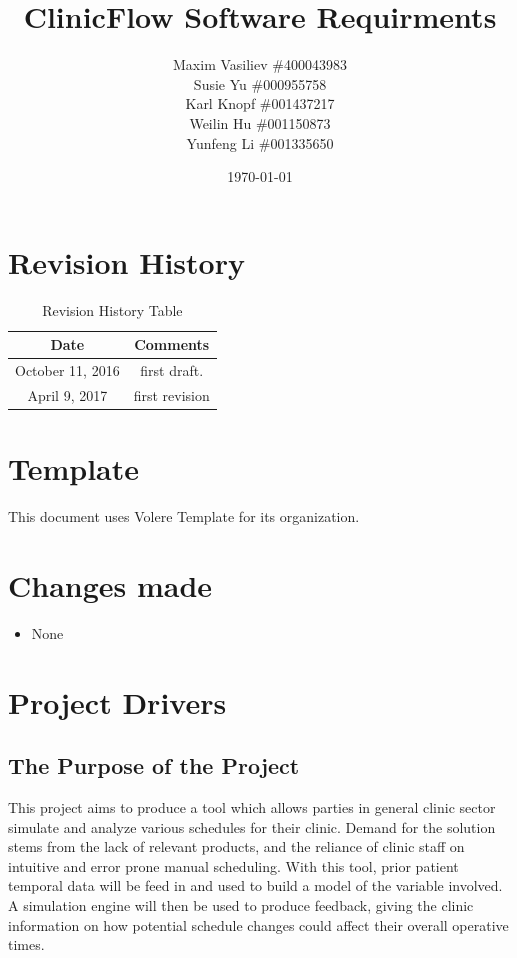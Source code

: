 \documentclass[12pt, titlepage]{article}
\begin{document}
\title{ClinicFlow Software Requirments} 
\author{Maxim Vasiliev \#400043983 \\ Susie Yu \#000955758\\ Karl Knopf \#001437217 \\ Weilin Hu \#001150873 \\ Yunfeng Li \#001335650}
\date{\today}
\maketitle

\tableofcontents 

\listoffigures

\listoftables
\pagebreak

\begin{table}[H]
\section*{Revision History}
\begin{tabular}{|c|c|}
\hline
\textbf{Date}  & \textbf{Comments} \\ \hline
October 11, 2016 &  first draft. \\ 
April 9, 2017 & first revision \\
\hline
\end{tabular}
\caption{Revision History Table}
\end{table}

\section*{Template}
This document uses Volere Template for its organization.
\pagebreak

\section{Changes made}
\begin{itemize}
 \item None
\end{itemize}

\section{Project Drivers}

\subsection{The Purpose of the Project}
This project aims to produce a tool which allows parties in general clinic sector simulate and analyze various schedules for their clinic. Demand for the solution stems from the lack of relevant products, and the reliance of clinic staff on intuitive and error prone manual scheduling. With this tool, prior patient temporal data will be feed in and used to build a model of the variable involved. A simulation engine will then be used to produce feedback, giving the clinic information on how potential schedule changes could affect their overall operative times.
\end{document}
